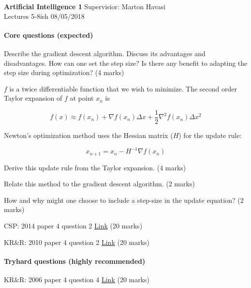 \documentclass{exam}
\begin{document}
\noindent
\large\textbf{Artificial Intelligence 1} \hfill Supervisior: Marton Havasi \\
\normalsize Lectures 5-8ish \hfill 08/05/2018

\paragraph{Core questions (expected)}
\begin{questions}
\question Describe the gradient descent algorithm. Discuss its advantages and disadvantages. How can one set the step size? Is there any benefit to adapting the step size during optimization? (4 marks)

\question $f$ is a twice differentiable function that we wish to minimize. The second order Taylor expansion of $f$ at point $x_n$ is

$$f(x) \approx f(x_n) + \nabla f(x_n)\Delta x + \frac{1}{2}\nabla ^2 f(x_n)\Delta x^2$$

Newton's optimization method uses the Hessian matrix ($H$) for the update rule:

$$x_{n+1} = x_n - H^{-1}\nabla f(x_n)$$

Derive this update rule from the Taylor expansion. (4 marks)

Relate this method to the gradient descent algorithm. (2 marks)

How and why might one choose to include a step-size in the update equation? (2 marks)

\question CSP: 2014 paper 4 question 2 \href{http://www.cl.cam.ac.uk/teaching/exams/pastpapers/y2014p4q2.pdf}{Link} (20 marks)

\question KR\&R: 2010 paper 4 question 2 \href{http://www.cl.cam.ac.uk/teaching/exams/pastpapers/y2010p4q2.pdf}{Link} (20 marks)

\end{questions}

\paragraph{Tryhard questions (highly recommended)}
\begin{questions}
\question KR\&R: 2006 paper 4 question 4 \href{http://www.cl.cam.ac.uk/teaching/exams/pastpapers/y2006p4q4.pdf}{Link} (20 marks)

\end{questions}
\end{document}
